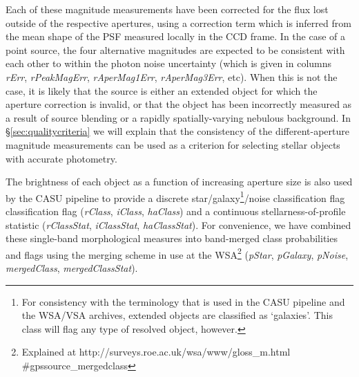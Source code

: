 \documentclass[a4paper,useAMS,usenatbib]{mn2e}
\begin{document}
Each of these magnitude measurements have been
corrected for the flux lost outside of the respective apertures,
using a correction term which is inferred from the
mean shape of the PSF measured locally in the CCD frame.
In the case of a point source,
the four alternative magnitudes are expected
to be consistent with each other to
within the photon noise uncertainty
(which is given in columns \emph{rErr}, \emph{rPeakMagErr},
\emph{rAperMag1Err}, \emph{rAperMag3Err}, etc).
When this is not the case,
it is likely that the source is either
an extended object for which the aperture correction is invalid,
or that the object has been incorrectly measured as a result of
source blending or a rapidly spatially-varying nebulous background.
In \S\ref{sec:qualitycriteria} we will explain that the consistency
of the different-aperture magnitude measurements
can be used as a criterion for selecting stellar objects
with accurate photometry.

The brightness of each object as a function of increasing
aperture size is also used by the CASU pipeline to provide
a discrete star/galaxy\footnote{For consistency with the terminology that is used in the CASU pipeline and the WSA/VSA archives, extended objects are classified as `galaxies'. This class will flag any type of resolved object, however.}/noise classification flag classification flag
(\emph{rClass}, \emph{iClass}, \emph{haClass})
and a continuous stellarness-of-profile statistic
(\emph{rClassStat}, \emph{iClassStat}, \emph{haClassStat}).
For convenience, we have combined
these single-band morphological measures
into band-merged class probabilities and flags
using the merging scheme in use at the WSA\footnote{Explained at
http://surveys.roe.ac.uk/wsa/www/gloss\_m.html \#gpssource\_mergedclass
} (\emph{pStar}, \emph{pGalaxy}, \emph{pNoise},
\emph{mergedClass}, \emph{mergedClassStat}).
\end{document}

